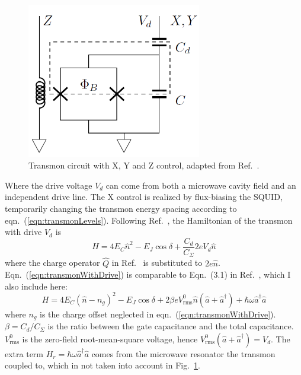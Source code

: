 \documentclass[%
groupedaddress,
showpacs,
 amsmath,amssymb,
 aps,
prb,
]{revtex4-1}
\begin{document}
            \begin{figure}[h]
                \centering
                \includegraphics[width=3in]{transmon_scheme.png}
                \caption{Transmon circuit with X, Y and Z control, adapted from Ref.~.}
                \label{fig:transmonSchematic}
            \end{figure}
            Where the drive voltage $V_d$ can come from both a microwave cavity field\cite{koch2007charge} and an independent drive line\cite{Barends2013Coherent}. The X control is realized by flux-biasing the SQUID, temporarily changing the transmon energy spacing according to eqn.~(\ref{eqn:transmonLevels}). Following Ref.~, the Hamiltonian of the transmon with drive $ V_d $ is
            \begin{equation}
            \label{eqn:transmonWithDrive}
                H = 4E_C \hat n^2  - E_J \cos \delta + \frac{C_d}{C_\Sigma} 2eV_d \hat n
            \end{equation}
            where the charge operator $\hat Q$ in Ref.~ is substituted to $ 2e \hat n $. Eqn.~(\ref{eqn:transmonWithDrive}) is comparable to Eqn.~(3.1) in Ref.~, which I also include here:
            \begin{equation}
            \label{eqn:transmonWithCavityDrive}
                H = 4E_C (\hat n - n_g)^2 - E_J \cos \delta +2 \beta e V^0_{\text{rms}}\hat n( \hat a + \hat a^\dagger ) + \hbar \omega \hat a^\dagger \hat a
            \end{equation}
            where $n_g$ is the charge offset neglected in eqn.~(\ref{eqn:transmonWithDrive}). $ \beta = C_d/C_\Sigma $ is the ratio between the gate capacitance and the total capacitance. $V^0_{\text{rms}} $ is the zero-field root-mean-square voltage, hence $V^0_{\text{rms}}( \hat a + \hat a^\dagger ) = V_d$. The extra term $H_r = \hbar \omega \hat a^\dagger \hat a$ comes from the microwave resonator the transmon coupled to, which in not taken into account in Fig.~\ref{fig:transmonSchematic}.
\end{document}
